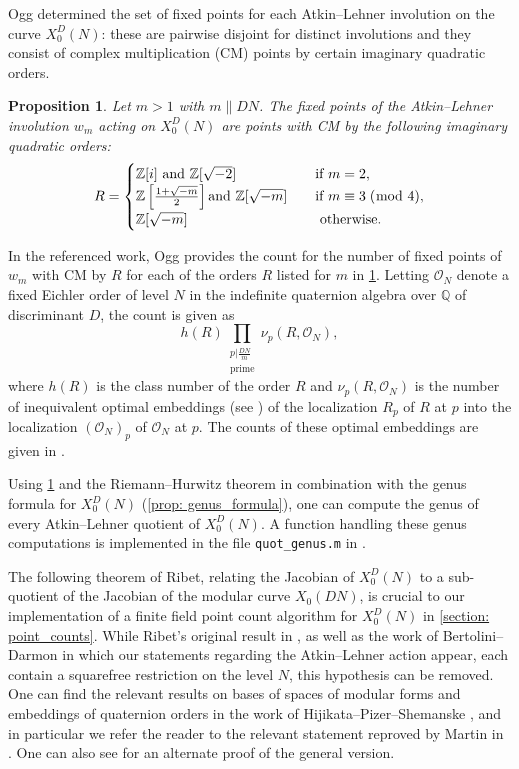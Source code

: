 \documentclass[11pt,reqno]{amsart}
\newcommand{\Q}{\mathbb{Q}}
\newcommand{\Z}{\mathbb{Z}}
\newtheorem{proposition}[theorem]{Proposition}
\theoremstyle{definition}
\begin{document}
Ogg determined the set of fixed points for each Atkin--Lehner involution on the curve $X_0^D(N)$: these are pairwise disjoint for distinct involutions and they consist of complex multiplication (CM) points by certain imaginary quadratic orders.
\begin{proposition}\cite[p. 283]{Ogg83}\label{prop: Ogg_fixed_pts}
    Let $m>1$ with $m \parallel DN$. The fixed points of the Atkin--Lehner involution $w_m$ acting on $X_0^D(N)$ are points with \textnormal{CM} by the following imaginary quadratic orders:
\[   
R = 
     \begin{cases}
       \Z[i] \text{ and } \Z[\sqrt{-2}] &\quad\textnormal{if } m = 2, \\
       \Z\left[\frac{1+\sqrt{-m}}{2}\right]\text{and } \Z[\sqrt{-m}] &\quad\textnormal{if } m \equiv 3 \;(\bmod \; 4), \\
       \Z[\sqrt{-m}] &\quad\textnormal{ otherwise}.\\
     \end{cases}
\]
\end{proposition}

In the referenced work, Ogg provides the count for the number of fixed points of $w_m$ with CM by $R$ for each of the orders $R$ listed for $m$ in \cref{prop: Ogg_fixed_pts}. Letting $\mathcal{O}_N$ denote a fixed Eichler order of level $N$ in the indefinite quaternion algebra over $\Q$ of discriminant $D$, the count is given as
\[
h(R) \prod_{\substack{p|\frac{DN}{m} \\ \text{prime}}} \nu_p(R,\mathcal{O}_N),
\]
where $h(R)$ is the class number of the order $R$ and $\nu_p(R,\mathcal{O}_N)$ is the number of inequivalent optimal embeddings (see \cite[Definition 30.3.2]{Voight21}) of the localization $R_p$ of $R$ at $p$ into the localization $(\mathcal{O}_N)_p$ of $\mathcal{O}_N$ at $p$. The counts of these optimal embeddings are given in \cite[Theorem 2]{Ogg83}.

Using \cref{prop: Ogg_fixed_pts} and the Riemann--Hurwitz theorem in combination with the genus formula for $X_0^D(N)$ (\cref{prop: genus_formula}), one can compute the genus of every Atkin--Lehner quotient of $X_0^D(N)$. A function handling these genus computations is implemented in the file \texttt{quot{\_}genus.m} in \cite{MPSSRep}. 

The following theorem of Ribet, relating the Jacobian of $X_0^D(N)$ to a sub-quotient of the Jacobian of the modular curve $X_0(DN)$, is crucial to our implementation of a finite field point count algorithm for $X_0^D(N)$ in \cref{section: point_counts}. While Ribet's original result in \cite{Ribet80}, as well as the work of Bertolini--Darmon \cite[\S 1]{BD96} in which our statements regarding the Atkin--Lehner action appear, each contain a squarefree restriction on the level $N$, this hypothesis can be removed. One can find the relevant results on bases of spaces of modular forms and embeddings of quaternion orders in the work of Hijikata--Pizer--Shemanske \cite{HPS89a, HPS89b}, and in particular we refer the reader to the relevant statement reproved by Martin in \cite[Theorem 1.1 (ii)]{Martin}. One can also see \cite[Corollary 3.3]{Roberts} for an alternate proof of the general version.
\end{document}
